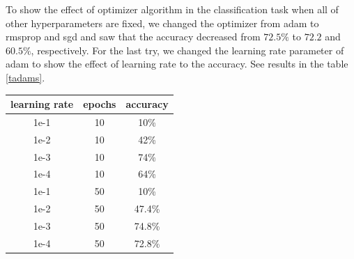 \documentclass[10pt]{SelfArx} %
\begin{document}
To show the effect of optimizer algorithm in the classification task when all of other hyperparameters are fixed, we changed the optimizer from adam to rmsprop and sgd and saw that the accuracy decreased from $72.5\%$ to $72.2$ and $60.5\%$, respectively. 
For the last try, we changed the learning rate parameter of adam  to show the effect of learning rate to the accuracy.  See results in the table \ref{tadams}.
\begin{center}
	\begin{tabular*}{.85\linewidth}{@{\extracolsep{\fill} }ccc@{}}
		\toprule
learning rate & epochs &accuracy \\ \midrule
1e-1&10 & 10\% \\
1e-2&10 & 42\% \\
1e-3 &10& 74\% \\
1e-4 &10& 64\% \\ 

1e-1 &50 & 10\% \\
1e-2 &50 & 47.4\% \\
1e-3 &50& 74.8\% \\
1e-4 &50& 72.8\% \\ 
\bottomrule
	\end{tabular*}
	\label{tadams}
\end{center}
\end{document}
